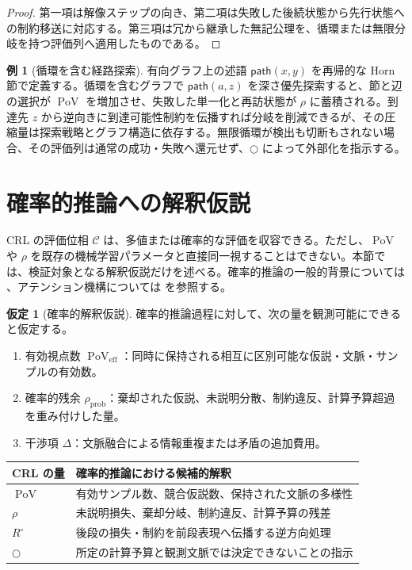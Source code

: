 \documentclass[a4paper,11pt]{ltjsarticle}
\theoremstyle{definition}
\newtheorem{assumption}[definition]{仮定}
\newtheorem{example}[definition]{例}
\theoremstyle{plain}
\newcommand{\PoV}{\operatorname{PoV}}
\newcommand{\dfix}{\bigcirc}
\begin{document}
\begin{proof}
第一項は解像ステップの向き、第二項は失敗した後続状態から先行状態への制約移送に対応する。第三項は冗から継承した無記公理を、循環または無限分岐を持つ評価列へ適用したものである。
\end{proof}

\begin{example}[循環を含む経路探索]
有向グラフ上の述語 $\mathsf{path}(x,y)$ を再帰的な Horn 節で定義する。循環を含むグラフで $\mathsf{path}(a,z)$ を深さ優先探索すると、節と辺の選択が $\PoV$ を増加させ、失敗した単一化と再訪状態が $\rho$ に蓄積される。到達先 $z$ から逆向きに到達可能性制約を伝播すれば分岐を削減できるが、その圧縮量は探索戦略とグラフ構造に依存する。無限循環が検出も切断もされない場合、その評価列は通常の成功・失敗へ還元せず、$\dfix$ によって外部化を指示する。
\end{example}

\section{確率的推論への解釈仮説}

CRL の評価位相 $\mathcal{C}$ は、多値または確率的な評価を収容できる。ただし、$\PoV$ や $\rho$ を既存の機械学習パラメータと直接同一視することはできない。本節では、検証対象となる解釈仮説だけを述べる。確率的推論の一般的背景については \cite{Bishop2006}、アテンション機構については \cite{Vaswani2017} を参照する。

\begin{assumption}[確率的解釈仮説]
確率的推論過程に対して、次の量を観測可能にできると仮定する。
\begin{enumerate}
 \item 有効視点数 $\PoV_{\mathrm{eff}}$：同時に保持される相互に区別可能な仮説・文脈・サンプルの有効数。
 \item 確率的残余 $\rho_{\mathrm{prob}}$：棄却された仮説、未説明分散、制約違反、計算予算超過を重み付けした量。
 \item 干渉項 $\Delta$：文脈融合による情報重複または矛盾の追加費用。
\end{enumerate}
\end{assumption}

\begin{center}
\begin{tabular}{>{\raggedright\arraybackslash}p{} >{\raggedright\arraybackslash}p{}}
\toprule
CRL の量 & 確率的推論における候補的解釈 \\
\midrule
$\PoV$ & 有効サンプル数、競合仮説数、保持された文脈の多様性 \\
$\rho$ & 未説明損失、棄却分岐、制約違反、計算予算の残差 \\
$R^\circ$ & 後段の損失・制約を前段表現へ伝播する逆方向処理 \\
$\dfix$ & 所定の計算予算と観測文脈では決定できないことの指示 \\
\bottomrule
\end{tabular}
\end{center}
\end{document}

